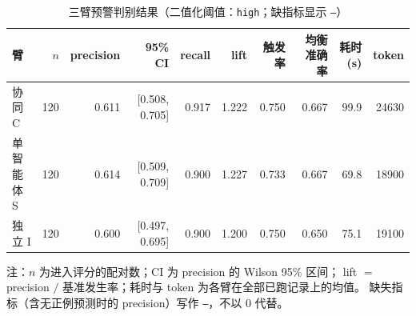 \begin{table}[t]
\centering
\caption{三臂预警判别结果（二值化阈值：\texttt{high}；缺指标显示 \texttt{--}）}
\label{tab:main}
\footnotesize
\setlength{\tabcolsep}{3pt}
\begin{tabular}{lrrrrrrrrr}
\toprule
臂 & $n$ & precision & 95\% CI & recall & lift & 触发率 & 均衡准确率 & 耗时(s) & token \\
\midrule
协同 C & 120 & 0.611 & [0.508, 0.705] & 0.917 & 1.222 & 0.750 & 0.667 & 99.9 & 24630 \\
单智能体 S & 120 & 0.614 & [0.509, 0.709] & 0.900 & 1.227 & 0.733 & 0.667 & 69.8 & 18900 \\
独立 I & 120 & 0.600 & [0.497, 0.695] & 0.900 & 1.200 & 0.750 & 0.650 & 75.1 & 19100 \\
\bottomrule
\end{tabular}
\par\smallskip
\raggedright\scriptsize
注：$n$ 为进入评分的配对数；CI 为 precision 的 Wilson 95\% 区间；
lift $=$ precision $/$ 基准发生率；耗时与 token 为各臂在全部已跑记录上的均值。
缺失指标（含无正例预测时的 precision）写作 \texttt{--}，不以 0 代替。
\end{table}
